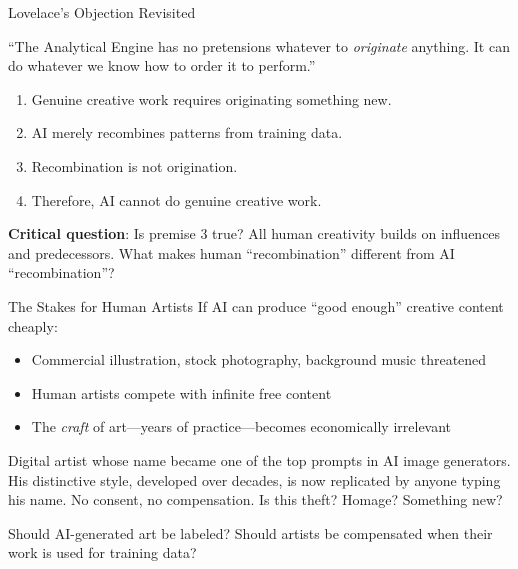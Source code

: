 ﻿\documentclass[aspectratio=169,11pt]{beamer}
\begin{document}
\begin{frame}{Lovelace's Objection Revisited}
\begin{quotebox}
\small
``The Analytical Engine has no pretensions whatever to \emph{originate} anything. It can do whatever we know how to order it to perform.''
\end{quotebox}

\vspace{0.2em}
\begin{probox}
\scriptsize
\begin{enumerate}
    \item Genuine creative work requires originating something new.
    \item AI merely recombines patterns from training data.
    \item Recombination is not origination.
    \item Therefore, AI cannot do genuine creative work.
\end{enumerate}
\end{probox}

\vspace{0.1em}
\textbf{Critical question}: Is premise 3 true? All human creativity builds on influences and predecessors. What makes human ``recombination'' different from AI ``recombination''?
\end{frame}

\begin{frame}{The Stakes for Human Artists}
If AI can produce ``good enough'' creative content cheaply:
\begin{itemize}
    \item Commercial illustration, stock photography, background music threatened
    \item Human artists compete with infinite free content
    \item The \emph{craft} of art---years of practice---becomes economically irrelevant
\end{itemize}

\vspace{0.2em}
\begin{casestudybox}
\scriptsize
Digital artist whose name became one of the top prompts in AI image generators. His distinctive style, developed over decades, is now replicated by anyone typing his name. No consent, no compensation. Is this theft? Homage? Something new?
\end{casestudybox}

\vspace{0.2em}
\begin{discussionbox}
\scriptsize
Should AI-generated art be labeled? Should artists be compensated when their work is used for training data?
\end{discussionbox}
\end{frame}
\end{document}
